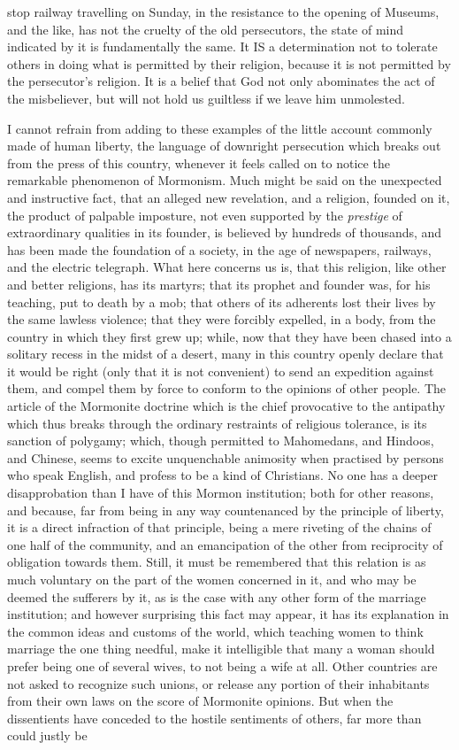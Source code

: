 \documentclass[12pt]{report}
\begin{document}
stop railway travelling on Sunday, in the resistance to the opening of Museums, and the like, has not the cruelty of the old persecutors, the state of mind indicated by it is fundamentally the same. It IS a determination not to tolerate others in doing what is permitted by their religion, because it is not permitted by the persecutor's religion. It is a belief that God not only abominates the act of the misbeliever, but will not hold us guiltless if we leave him unmolested.

I cannot refrain from adding to these examples of the little account commonly made of human liberty, the language of downright persecution which breaks out from the press of this country, whenever it feels called on to notice the remarkable phenomenon of Mormonism. Much might be said on the unexpected and instructive fact, that an alleged new revelation, and a religion, founded on it, the product of palpable imposture, not even supported by the \emph{prestige} of extraordinary qualities in its founder, is believed by hundreds of thousands, and has been made the foundation of a society, in the age of newspapers, railways, and the electric telegraph. What here concerns us is, that this religion, like other and better religions, has its martyrs; that its prophet and founder was, for his teaching, put to death by a mob; that others of its adherents lost their lives by the same lawless violence; that they were forcibly expelled, in a body, from the country in which they first grew up; while, now that they have been chased into a solitary recess in the midst of a desert, many in this country openly declare that it would be right (only that it is not convenient) to send an expedition against them, and compel them by force to conform to the opinions of other people. The article of the Mormonite doctrine which is the chief provocative to the antipathy which thus breaks through the ordinary restraints of religious tolerance, is its sanction of polygamy; which, though permitted to Mahomedans, and Hindoos, and Chinese, seems to excite unquenchable animosity when practised by persons who speak English, and profess to be a kind of Christians. No one has a deeper disapprobation than I have of this Mormon institution; both for other reasons, and because, far from being in any way countenanced by the principle of liberty, it is a direct infraction of that principle, being a mere riveting of the chains of one half of the community, and an emancipation of the other from reciprocity of obligation towards them. Still, it must be remembered that this relation is as much voluntary on the part of the women concerned in it, and who may be deemed the sufferers by it, as is the case with any other form of the marriage institution; and however surprising this fact may appear, it has its explanation in the common ideas and customs of the world, which teaching women to think marriage the one thing needful, make it intelligible that many a woman should prefer being one of several wives, to not being a wife at all. Other countries are not asked to recognize such unions, or release any portion of their inhabitants from their own laws on the score of Mormonite opinions. But when the dissentients have conceded to the hostile sentiments of others, far more than could justly be 
\end{document}
